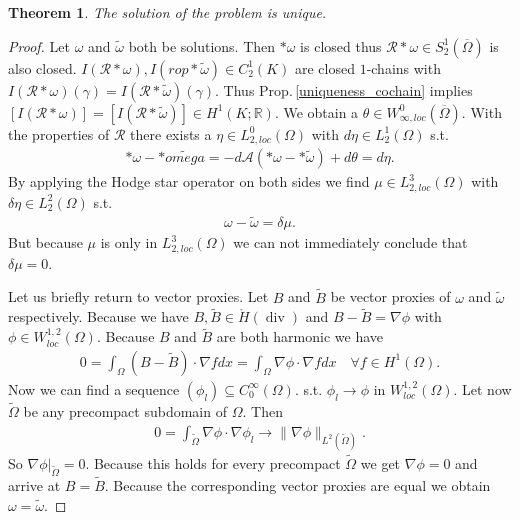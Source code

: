 \documentclass[12pt,a4paper]{article}
\newtheorem{theorem}{Theorem}
\theoremstyle{definition}
\DeclareMathOperator{\diver}{div}
\newcommand{\aop}{\mathscr{A}}
\newcommand{\omegabar}{\overline{\Omega}}
\newcommand{\real}{\mathbb{R}}
\newcommand{\rop}{\mathscr{R}} %
\begin{document}
\begin{theorem}
    The solution of the problem is unique.
\end{theorem}
\begin{proof}
    Let $\omega$ and $\tilde{\omega}$ both be solutions. Then $*\omega$ is 
    closed thus $\rop *\omega \in S_2^1(\omegabar)$ is also closed. 
    $I(\rop * \omega), I(rop * \tilde{\omega}) \in C^1_2(K)$ 
    are closed $1$-chains with
    $I(\rop * \omega)(\gamma) = I(\rop * \tilde{\omega})(\gamma)$. 
    Thus Prop.\,\ref{uniqueness_cochain} implies 
    $[I(\rop * \omega)] = [I(\rop * \tilde{\omega})] \in H^1(K;\real)$.
    We obtain a $\theta \in W_{\infty,loc}^0(\omegabar)$. With the 
    properties of $\rop$ there exists a $\eta \in L_{2,loc}^0(\Omega)$
    with $d\eta \in L^1_2(\Omega)$ s.t. 
    \begin{align*}
        *\omega - *\tilde{omega} = -d\aop(*\omega - *\tilde{\omega})
        + d \theta = d\eta.
    \end{align*}
    By applying the Hodge star operator on both sides we find 
    $\mu \in L_{2,loc}^3(\Omega)$ with $\delta \eta \in L^2_2(\Omega)$ s.t.
    \begin{align*}
        \omega - \tilde{\omega} = \delta \mu.
    \end{align*}
    But because $\mu$ is only in $L_{2,loc}^3(\Omega)$ 
    we can not immediately conclude that $\delta \mu = 0$.

    Let us briefly return to vector proxies. Let $B$ and $\tilde{B}$ be 
    vector proxies of $\omega$ and $\tilde{\omega}$ respectively. 
    Because we have $B, \tilde{B} \in \mathring{H}(\diver)$ %
    and $B-\tilde{B} = \nabla \phi$ with $\phi \in W^{1,2}_{loc}(\Omega)$.
    Because $B$ and $\tilde{B}$ are both harmonic we have 
    \begin{align*}
        0 = \int_\Omega (B-\tilde{B}) \cdot \nabla f dx 
        = \int_\Omega \nabla \phi \cdot \nabla f dx
        \quad \forall 
        f \in H^1(\Omega).
    \end{align*}
    Now we can find a sequence $(\phi_l) \subseteq C_0^\infty(\Omega)$. 
    s.t. $\phi_l \rightarrow \phi$ in $W^{1,2}_{loc}(\Omega)$. 
    Let now $\tilde{\Omega}$ be any precompact subdomain of $\Omega$. Then
    \begin{align*}
        0 = \int_{\tilde{\Omega}} \nabla\phi \cdot \nabla \phi_l 
        \rightarrow \lVert \nabla \phi \rVert _{L^2(\tilde{\Omega})}.
    \end{align*}
    So $\nabla \phi |_{\tilde{\Omega}} = 0$. Because this holds for every 
    precompact $\tilde{\Omega}$ we get $\nabla \phi  = 0$ and arrive at
    $B = \tilde{B}$. Because the corresponding vector proxies are equal we 
    obtain $\omega = \tilde{\omega}$.
\end{proof}
\end{document}
